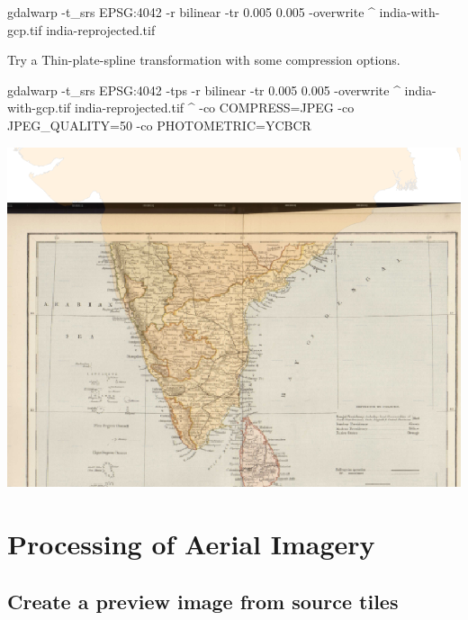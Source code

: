 \documentclass[12pt,a4paper]{article}
\newenvironment{Shaded}{\begin{snugshade}}{\end{snugshade}}
\newcommand{\ExtensionTok}[1]{#1}
\newcommand{\NormalTok}[1]{#1}
\begin{document}
\begin{Shaded}
\begin{Highlighting}[]
\ExtensionTok{gdalwarp}\NormalTok{ -t_srs EPSG:4042 -r bilinear -tr 0.005 0.005 -overwrite ^}
  \ExtensionTok{india-with-gcp.tif}\NormalTok{ india-reprojected.tif}
\end{Highlighting}
\end{Shaded}

Try a Thin-plate-spline transformation with some compression options.

\begin{Shaded}
\begin{Highlighting}[]
\ExtensionTok{gdalwarp}\NormalTok{ -t_srs EPSG:4042 -tps -r bilinear -tr 0.005 0.005 -overwrite ^}
  \ExtensionTok{india-with-gcp.tif}\NormalTok{ india-reprojected.tif ^}
  \ExtensionTok{-co}\NormalTok{ COMPRESS=JPEG -co JPEG_QUALITY=50 -co PHOTOMETRIC=YCBCR}
\end{Highlighting}
\end{Shaded}

\begin{center}\includegraphics{images/gdal/georeference_gcp} \end{center}

\hypertarget{processing-of-aerial-imagery}{%
\section{Processing of Aerial
Imagery}\label{processing-of-aerial-imagery}}

\hypertarget{create-a-preview-image-from-source-tiles}{%
\subsection{Create a preview image from source
tiles}\label{create-a-preview-image-from-source-tiles}}
\end{document}
